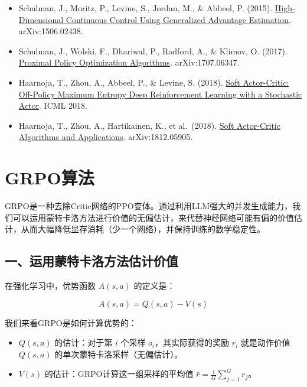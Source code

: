 \vspace{0.25em}
\begin{itemize}
\tightlist
\item
  Schulman, J., Moritz, P., Levine, S., Jordan, M., \& Abbeel, P. (2015). \href{https://arxiv.org/abs/1506.02438}{High-Dimensional Continuous Control Using Generalized Advantage Estimation}. arXiv:1506.02438.
\item
  Schulman, J., Wolski, F., Dhariwal, P., Radford, A., \& Klimov, O. (2017). \href{https://arxiv.org/abs/1707.06347}{Proximal Policy Optimization Algorithms}. arXiv:1707.06347.
\item
  Haarnoja, T., Zhou, A., Abbeel, P., \& Levine, S. (2018). \href{https://arxiv.org/abs/1801.01290}{Soft Actor-Critic: Off-Policy Maximum Entropy Deep Reinforcement Learning with a Stochastic Actor}. ICML 2018.
\item
  Haarnoja, T., Zhou, A., Hartikainen, K., et al.~(2018). \href{https://arxiv.org/abs/1812.05905}{Soft Actor-Critic Algorithms and Applications}. arXiv:1812.05905.
\end{itemize}

\clearpage

\hypertarget{grpoux7b97ux6cd5}{%
\section{GRPO算法}\label{grpoux7b97ux6cd5}}

GRPO是一种去除Critic网络的PPO变体。通过利用LLM强大的并发生成能力，我们可以运用蒙特卡洛方法进行价值的无偏估计，来代替神经网络可能有偏的价值估计，从而大幅降低显存消耗（少一个网络），并保持训练的数学稳定性。

\hypertarget{ux4e00ux8fd0ux7528ux8499ux7279ux5361ux6d1bux65b9ux6cd5ux4f30ux8ba1ux4ef7ux503c}{%
\subsection{一、运用蒙特卡洛方法估计价值}\label{ux4e00ux8fd0ux7528ux8499ux7279ux5361ux6d1bux65b9ux6cd5ux4f30ux8ba1ux4ef7ux503c}}

在强化学习中，优势函数 \(A(s,a)\) 的定义是：

\[
A(s,a)=Q(s,a)-V(s)
\]

我们来看GRPO是如何计算优势的：

\begin{itemize}
\tightlist
\item
  \(Q(s,a)\) 的估计：对于第 \(i\) 个采样 \(o_i\)，其实际获得的奖励 \(r_i\) 就是动作价值 \(Q(s,a)\) 的单次蒙特卡洛采样（无偏估计）。
\item
  \(V(s)\) 的估计：GRPO计算这一组采样的平均值 \(\bar{r}=\frac{1}{G}\sum_{j=1}^{G}r_j\)。
\end{itemize}

